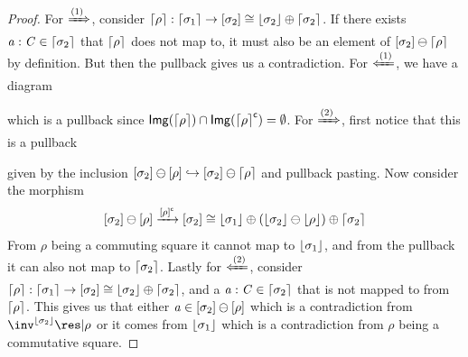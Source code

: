 \begin{proof}
    For $\xRightarrow{(1)}$, consider $\lceil\rho\rceil : \lceil\sigma_1\rceil \to [\sigma_2] \cong \lfloor\sigma_2\rfloor \oplus \lceil\sigma_2\rceil$.
    If there exists $\mathit{a} : \mathit{C} \in \lceil\sigma_2\rceil$ that $\lceil\rho\rceil$ does not map to, it must also be an element of $[\sigma_2] \ominus \lceil\rho\rceil$ by definition. 
    But then the pullback gives us a contradiction.
    For $\xLeftarrow{(1)}$, we have a diagram
    \begin{center}
    \end{center}
    which is a pullback since $\mathsf{Img}(\lceil\rho\rceil) \cap \mathsf{Img}({\lceil\rho\rceil}^\mathsf{c}) = \emptyset$.
    For $\xRightarrow{(2)}$, first notice that this is a pullback
    \begin{center}
    \end{center}
    given by the inclusion $[\sigma_2] \ominus [\rho] \hookrightarrow [\sigma_2] \ominus \lceil\rho\rceil$ and pullback pasting.
    Now consider the morphism
    \[ [\sigma_2] \ominus [\rho] \xrightarrow{{[\rho]}^\mathsf{c}} [\sigma_2] \cong \lfloor\sigma_1\rfloor \oplus (\lfloor\sigma_2\rfloor \ominus \lfloor\rho\rfloor) \oplus \lceil\sigma_2\rceil \]
    From $\rho$ being a commuting square it cannot map to $\lfloor\sigma_1\rfloor$, and from the pullback it can also not map to $\lceil\sigma_2\rceil$.
    Lastly for $\xLeftarrow{(2)}$, consider $\lceil\rho\rceil : \lceil\sigma_1\rceil \to [\sigma_2] \cong \lfloor\sigma_2\rfloor \oplus \lceil\sigma_2\rceil$, and a $\mathit{a} : \mathit{C} \in \lceil\sigma_2\rceil$ that is not mapped to from $\lceil\rho\rceil$.
    This gives us that either $\mathit{a} \in [\sigma_2] \ominus [\rho]$ which is a contradiction from $\inv^{\concL{\sigma_2}}\res|\rho$
    or it comes from $\lfloor\sigma_1\rfloor$ which is a contradiction from $\rho$ being a commutative square.

\end{proof}

